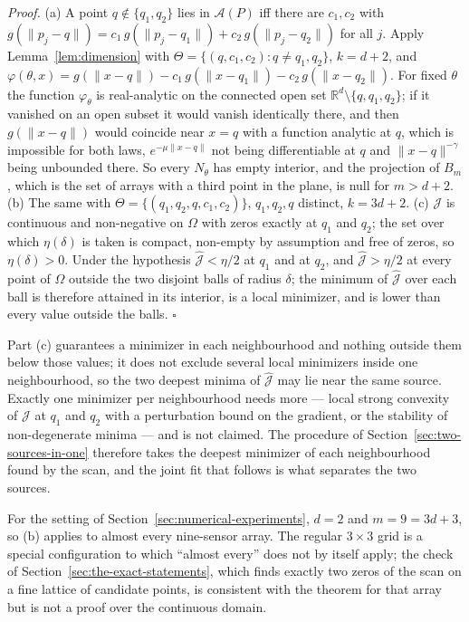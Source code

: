 \documentclass{article}
\begin{document}
\textit{Proof.} (a) A point $q \notin \{q_1, q_2\}$ lies in $\mathcal{A}(P)$ iff there are $c_1, c_2$ with $g(\lVert p_j - q \rVert) = c_1\, g(\lVert p_j - q_1 \rVert) + c_2\, g(\lVert p_j - q_2 \rVert)$ for all $j$. Apply Lemma~\ref{lem:dimension} with $\Theta = \{(q, c_1, c_2) : q \ne q_1, q_2\}$, $k = d + 2$, and $\varphi(\theta, x) = g(\lVert x - q \rVert) - c_1\, g(\lVert x - q_1 \rVert) - c_2\, g(\lVert x - q_2 \rVert)$. For fixed $\theta$ the function $\varphi_\theta$ is real-analytic on the connected open set $\mathbb{R}^{d} \setminus \{q, q_1, q_2\}$; if it vanished on an open subset it would vanish identically there, and then $g(\lVert x - q \rVert)$ would coincide near $x = q$ with a function analytic at $q$, which is impossible for both laws, $e^{-\mu \lVert x - q \rVert}$ not being differentiable at $q$ and $\lVert x - q \rVert^{-\gamma}$ being unbounded there. So every $N_\theta$ has empty interior, and the projection of $B_m$, which is the set of arrays with a third point in the plane, is null for $m > d + 2$. (b) The same with $\Theta = \{(q_1, q_2, q, c_1, c_2)\}$, $q_1, q_2, q$ distinct, $k = 3d + 2$. (c) $\mathcal{J}$ is continuous and non-negative on $\Omega$ with zeros exactly at $q_1$ and $q_2$; the set over which $\eta(\delta)$ is taken is compact, non-empty by assumption and free of zeros, so $\eta(\delta) > 0$. Under the hypothesis $\widehat{\mathcal{J}} < \eta/2$ at $q_1$ and at $q_2$, and $\widehat{\mathcal{J}} > \eta/2$ at every point of $\Omega$ outside the two disjoint balls of radius $\delta$; the minimum of $\widehat{\mathcal{J}}$ over each ball is therefore attained in its interior, is a local minimizer, and is lower than every value outside the balls. $\square$

Part (c) guarantees a minimizer in each neighbourhood and nothing outside them below those values; it does not exclude several local minimizers inside one neighbourhood, so the two deepest minima of $\widehat{\mathcal{J}}$ may lie near the same source. Exactly one minimizer per neighbourhood needs more --- local strong convexity of $\mathcal{J}$ at $q_1$ and $q_2$ with a perturbation bound on the gradient, or the stability of non-degenerate minima --- and is not claimed. The procedure of Section~\ref{sec:two-sources-in-one} therefore takes the deepest minimizer of each neighbourhood found by the scan, and the joint fit that follows is what separates the two sources.

For the setting of Section~\ref{sec:numerical-experiments}, $d = 2$ and $m = 9 = 3d + 3$, so (b) applies to almost every nine-sensor array. The regular $3 \times 3$ grid is a special configuration to which ``almost every'' does not by itself apply; the check of Section~\ref{sec:the-exact-statements}, which finds exactly two zeros of the scan on a fine lattice of candidate points, is consistent with the theorem for that array but is not a proof over the continuous domain.
\end{document}
